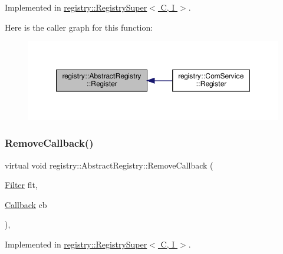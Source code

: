 Implemented in \hyperlink{classregistry_1_1RegistrySuper_a6293786807c1d9cc1f72a60c8c218b6f}{registry\+::\+Registry\+Super$<$ C, I $>$}.

Here is the caller graph for this function\+:\nopagebreak
\begin{figure}[H]
\begin{center}
\leavevmode
\includegraphics[width=350pt]{classregistry_1_1AbstractRegistry_a5deafe61aa33b1be6b261d815e7397a1_icgraph}
\end{center}
\end{figure}
\mbox{\label{classregistry_1_1AbstractRegistry_ae09a4b165d916b6c212988d882d1a33f}} 
\subsubsection{\texorpdfstring{Remove\+Callback()}{RemoveCallback()}}
{\footnotesize\ttfamily virtual void registry\+::\+Abstract\+Registry\+::\+Remove\+Callback (\begin{DoxyParamCaption}\item[{\hyperlink{classregistry_1_1Filter}{Filter}}]{flt,  }\item[{\hyperlink{classregistry_1_1AbstractRegistry_a08a798ca9ca1c4c983ebd2386ca3c315}{Callback}}]{cb }\end{DoxyParamCaption})\hspace{0.3cm}{\ttfamily [pure virtual]}, {\ttfamily [noexcept]}}



Implemented in \hyperlink{classregistry_1_1RegistrySuper_a61948ba29418a844f1b2c9b1259e26bf}{registry\+::\+Registry\+Super$<$ C, I $>$}.

\mbox{\label{classregistry_1_1AbstractRegistry_ac5bb3b6a75a63a474f6b0afb31ea51c1}} 
